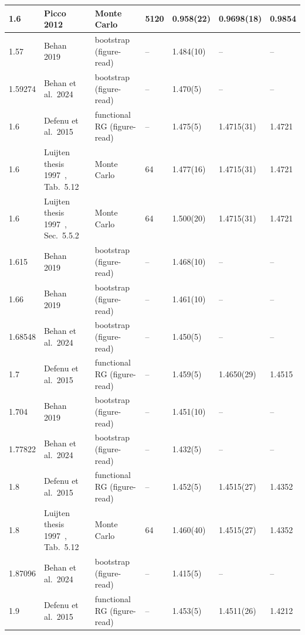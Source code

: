 \documentclass[10pt,a4paper]{article}
\begin{document}
\begin{table}[htbp]
\begin{tabular}{@{}lllllll@{}}
1.6 & Picco 2012~\cite{Picco:2012ak} & Monte Carlo & 5120 & 0.958(22) & 0.9698(18) & 0.9854 \\
\midrule
1.57 & Behan 2019~\cite{Behan:2018hfx} & bootstrap (figure-read) & -- & 1.484(10) & -- & -- \\
1.59274 & Behan et al.\ 2024~\cite{Behan:2023ile} & bootstrap (figure-read) & -- & 1.470(5) & -- & -- \\
1.6 & Defenu et al.\ 2015~\cite{Defenu:2014bea} & functional RG (figure-read) & -- & 1.475(5) & 1.4715(31) & 1.4721 \\
1.6 & Luijten thesis 1997~\cite{Luijten:1997th}, Tab.~5.12 & Monte Carlo & 64 & 1.477(16) & 1.4715(31) & 1.4721 \\
1.6 & Luijten thesis 1997~\cite{Luijten:1997th}, Sec.~5.5.2 & Monte Carlo & 64 & 1.500(20) & 1.4715(31) & 1.4721 \\
1.615 & Behan 2019~\cite{Behan:2018hfx} & bootstrap (figure-read) & -- & 1.468(10) & -- & -- \\
1.66 & Behan 2019~\cite{Behan:2018hfx} & bootstrap (figure-read) & -- & 1.461(10) & -- & -- \\
1.68548 & Behan et al.\ 2024~\cite{Behan:2023ile} & bootstrap (figure-read) & -- & 1.450(5) & -- & -- \\
1.7 & Defenu et al.\ 2015~\cite{Defenu:2014bea} & functional RG (figure-read) & -- & 1.459(5) & 1.4650(29) & 1.4515 \\
1.704 & Behan 2019~\cite{Behan:2018hfx} & bootstrap (figure-read) & -- & 1.451(10) & -- & -- \\
1.77822 & Behan et al.\ 2024~\cite{Behan:2023ile} & bootstrap (figure-read) & -- & 1.432(5) & -- & -- \\
1.8 & Defenu et al.\ 2015~\cite{Defenu:2014bea} & functional RG (figure-read) & -- & 1.452(5) & 1.4515(27) & 1.4352 \\
1.8 & Luijten thesis 1997~\cite{Luijten:1997th}, Tab.~5.12 & Monte Carlo & 64 & 1.460(40) & 1.4515(27) & 1.4352 \\
1.87096 & Behan et al.\ 2024~\cite{Behan:2023ile} & bootstrap (figure-read) & -- & 1.415(5) & -- & -- \\
1.9 & Defenu et al.\ 2015~\cite{Defenu:2014bea} & functional RG (figure-read) & -- & 1.453(5) & 1.4511(26) & 1.4212 \\
\bottomrule\end{tabular}
\end{table}
\end{document}
